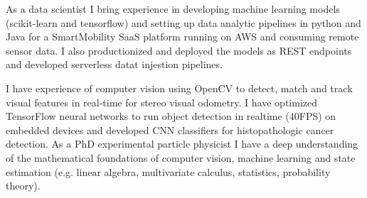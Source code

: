 \documentclass[11pt, a4paper]{awesome-cv}
\begin{document}
\begin{cvletter}
As a data scientist I bring experience in developing machine learning 
models (scikit-learn and tensorflow) and setting up data analytic pipelines in python and Java 
for a SmartMobility SaaS platform running on AWS and consuming remote sensor data. 
I also productionized and deployed the models as REST endpoints and developed serverless datat 
injestion pipelines.


I have experience of computer vision using OpenCV to detect, match and track 
visual features in real-time for stereo visual odometry. 
I have optimized TensorFlow neural networks 
to run object detection in realtime (40FPS) on embedded devices and developed
CNN classifiers for histopathologic cancer detection.
As a PhD experimental particle physicist I have a deep understanding of the mathematical foundations of 
computer vision, machine learning and state estimation 
(e.g. linear algebra, multivariate calculus, statistics, probability theory).

\end{cvletter}


\makeletterclosing
\end{document}
